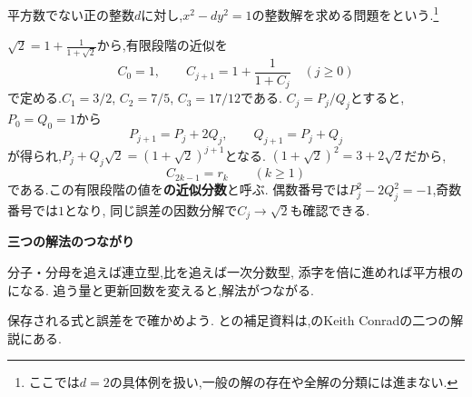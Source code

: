   平方数でない正の整数$d$に対し,$x^2-dy^2=1$の整数解を求める問題を\textbf{}という.\footnote{ここでは$d=2$の具体例を扱い,一般の解の存在や全解の分類には進まない.}

  $\sqrt2=1+\frac1{1+\sqrt2}$から,有限段階の近似を
  \[
    C_0=1,\qquad C_{j+1}=1+\frac1{1+C_j}
    \quad(j\ge0)
  \]
  で定める.$C_1=3/2$, $C_2=7/5$, $C_3=17/12$である.
  $C_j=P_j/Q_j$とすると,$P_0=Q_0=1$から
  \[
    P_{j+1}=P_j+2Q_j,\qquad Q_{j+1}=P_j+Q_j
  \]
  が得られ,$P_j+Q_j\sqrt2=(1+\sqrt2)^{j+1}$となる.
  $(1+\sqrt2)^2=3+2\sqrt2$だから,
  \[
    C_{2k-1}=r_k\qquad(k\ge1)
  \]
  である.この有限段階の値を\textbf{の近似分数}と呼ぶ.
  偶数番号では$P_j^2-2Q_j^2=-1$,奇数番号では$1$となり,
  同じ誤差の因数分解で$C_j\to\sqrt2$も確認できる.

  \begin{bookpoint}
    \textbf{三つの解法のつながり}\par
    分子・分母を追えば連立型,比を追えば一次分数型,
    添字を倍に進めれば平方根のになる.
    追う量と更新回数を変えると,解法がつながる.
  \end{bookpoint}
  保存される式と誤差をで確かめよう.
  との補足資料は,のKeith Conradの二つの解説にある.
